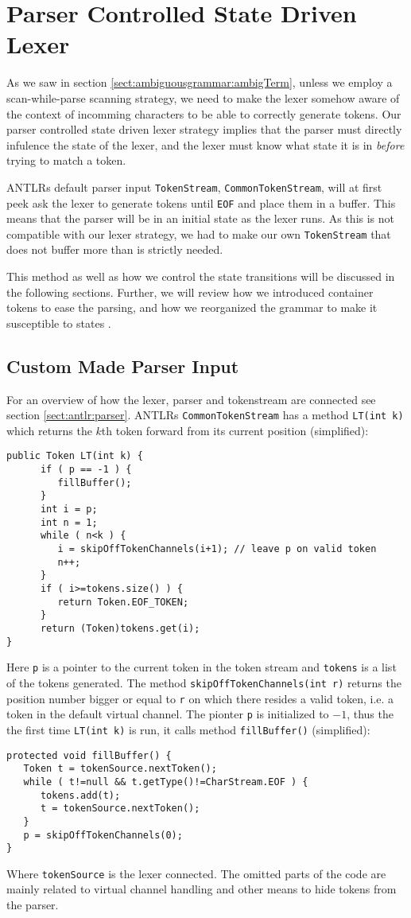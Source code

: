\section{Parser Controlled State Driven Lexer}
\label{sect:impl:parser_controlled_state_driven_lexer}
As we saw in section \ref{sect:ambiguousgrammar:ambigTerm}, unless we employ a scan-while-parse scanning strategy, we need to make the lexer somehow aware of the context of incomming characters to be able to correctly generate tokens. Our parser controlled state driven lexer strategy implies that the parser must directly infulence the state of the lexer, and the lexer must know what state it is in \emph{before} trying to match a token. 

ANTLRs default parser input \verb!TokenStream!, \verb!CommonTokenStream!, will at first peek ask the lexer to generate tokens until \verb!EOF! and place them in a buffer. This means that the parser will be in an initial state as the lexer runs. As this is not compatible with our lexer strategy, we had to make our own \verb!TokenStream! that does not buffer more than is strictly needed. 

This method as well as how we control the state transitions will be discussed in the following sections. Further, we will review how we introduced container tokens to ease the parsing, and how we reorganized the grammar to make it susceptible to states .

\subsection{Custom Made Parser Input}
For an overview of how the lexer, parser and tokenstream are connected see section \ref{sect:antlr:parser}. ANTLRs \verb!CommonTokenStream! has a method \verb!LT(int k)! which returns the $k$th token forward from its current position (simplified):
\begin{Verbatim}
public Token LT(int k) {
      if ( p == -1 ) {
         fillBuffer();
      }
      int i = p;
      int n = 1;
      while ( n<k ) {
         i = skipOffTokenChannels(i+1); // leave p on valid token
         n++;
      }
      if ( i>=tokens.size() ) {
         return Token.EOF_TOKEN;
      }
      return (Token)tokens.get(i);
}
\end{Verbatim}
Here \verb!p! is a pointer to the current token in the token stream and \verb!tokens! is a list of the tokens generated. The method \verb!skipOffTokenChannels(int r)! returns the position number bigger or equal to \verb!r! on which there resides a valid token, i.e. a token in the default virtual channel. The pionter \verb!p! is initialized to $-1$, thus the the first time \verb!LT(int k)! is run, it calls method \verb!fillBuffer()! (simplified):
\begin{Verbatim}
protected void fillBuffer() {
   Token t = tokenSource.nextToken();
   while ( t!=null && t.getType()!=CharStream.EOF ) {
      tokens.add(t);
      t = tokenSource.nextToken();
   }
   p = skipOffTokenChannels(0);
}
\end{Verbatim}
Where \verb!tokenSource! is the lexer connected. The omitted parts of the code are mainly related to virtual channel handling and other means to hide tokens from the parser. 

